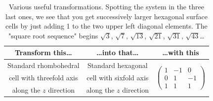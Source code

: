 \documentclass[11pt]{article}
\newcommand{\T}{\rule{0pt}{2.6ex}}
\newcommand{\B}{\rule[-1.2ex]{0pt}{0pt}}
\newcommand{\BM}{\rule[-5ex]{0pt}{0pt}}
\begin{document}
\begin{table}[htdp]
\caption{Various useful transformations. Spotting the system in the three last ones, we see that you get successively larger hexagonal surface cells by just adding 1 to the two upper left diagonal elements. The "square root sequence" begins $\sqrt{3}$, $\sqrt{7}$, $\sqrt{13}$, $\sqrt{21}$, $\sqrt{31}$, $\sqrt{43}$\ldots}
\begin{center}
\begin{tabular}{c|c|c}
Transform this\ldots & \ldots into that\ldots & \ldots with this \\\hline\hline
\T Standard rhombohedral & Standard hexagonal & \multirow{3}{*}{$\begin{pmatrix} 1& -1 & 0\\0 & 1& -1\\ 1&1 &1 \end{pmatrix}$}\\
cell with threefold axis & cell with sixfold axis & \\
along the $z$ direction & along the $z$ direction & \B \\\hline

\end{tabular}
\end{center}
\end{table}
\end{document}
